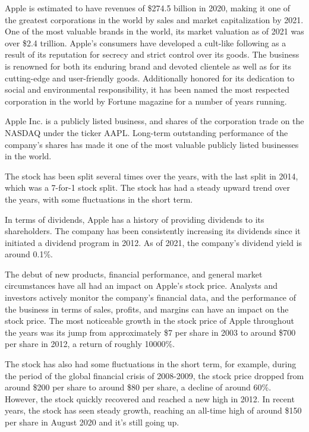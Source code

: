 \documentclass[a4paper]{article}
\begin{document}
Apple is estimated to have revenues of \$274.5 billion in 2020, making it one of the greatest corporations in the world by sales and market capitalization by 2021. One of the most valuable brands in the world, its market valuation as of 2021 was over \$2.4 trillion. Apple's consumers have developed a cult-like following as a result of its reputation for secrecy and strict control over its goods. The business is renowned for both its enduring brand and devoted clientele as well as for its cutting-edge and user-friendly goods. Additionally honored for its dedication to social and environmental responsibility, it has been named the most respected corporation in the world by Fortune magazine for a number of years running.

Apple Inc. is a publicly listed business, and shares of the corporation trade on the NASDAQ under the ticker AAPL. Long-term outstanding performance of the company's shares has made it one of the most valuable publicly listed businesses in the world.

The stock has been split several times over the years, with the last split in 2014, which was a 7-for-1 stock split. The stock has had a steady upward trend over the years, with some fluctuations in the short term.

In terms of dividends, Apple has a history of providing dividends to its shareholders. The company has been consistently increasing its dividends since it initiated a dividend program in 2012. As of 2021, the company's dividend yield is around 0.1\%.

The debut of new products, financial performance, and general market circumstances have all had an impact on Apple's stock price. Analysts and investors actively monitor the company's financial data, and the performance of the business in terms of sales, profits, and margins can have an impact on the stock price. The most noticeable growth in the stock price of Apple throughout the years was its jump from approximately \$7 per share in 2003 to around \$700 per share in 2012, a return of roughly 10000\%.

The stock has also had some fluctuations in the short term, for example, during the period of the global financial crisis of 2008-2009, the stock price dropped from around \$200 per share to around \$80 per share, a decline of around 60\%. However, the stock quickly recovered and reached a new high in 2012. In recent years, the stock has seen steady growth, reaching an all-time high of around \$150 per share in August 2020 and it's still going up.
\end{document}
